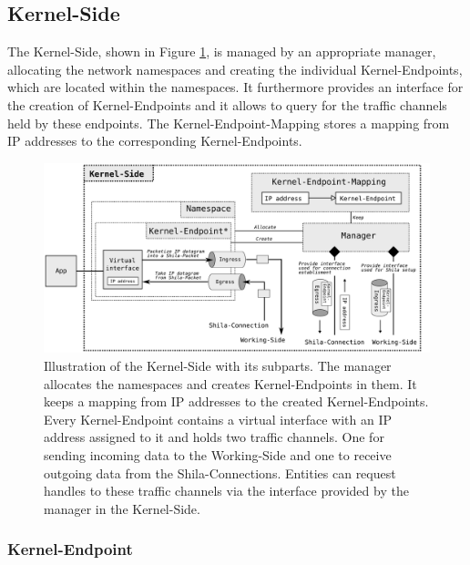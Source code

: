 \subsection*{Kernel-Side}

The Kernel-Side, shown in Figure \ref{fig:ImplementationModulesKernelSide}, is managed by an appropriate manager, allocating the network namespaces and creating the individual Kernel-Endpoints, which are located within the namespaces. It furthermore provides an interface for the creation of Kernel-Endpoints and it allows to query for the traffic channels held by these endpoints. The Kernel-Endpoint-Mapping stores a mapping from IP addresses to the corresponding Kernel-Endpoints.  

\begin{figure}
	\begin{center}
		\def\svgwidth{1\textwidth}
		\includegraphics[scale=0.2]{../illustrations/implementation/ModulesKernelSide.pdf}   
		\caption[]{Illustration of the Kernel-Side with its subparts. The manager allocates the namespaces and creates Kernel-Endpoints in them. It keeps a mapping from IP addresses to the created Kernel-Endpoints. Every Kernel-Endpoint contains a virtual interface with an IP address assigned to it and holds two traffic channels. One for sending incoming data to the Working-Side and one to receive outgoing data from the Shila-Connections. Entities can request handles to these traffic channels via the interface provided by the manager in the Kernel-Side.}
		\label{fig:ImplementationModulesKernelSide}
	\end{center}
\end{figure}


\subsubsection{Kernel-Endpoint}

